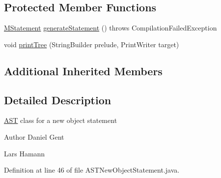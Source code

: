 \subsection*{Protected Member Functions}
\begin{DoxyCompactItemize}
\item 
\hyperlink{classorg_1_1tzi_1_1use_1_1uml_1_1sys_1_1soil_1_1_m_statement}{M\-Statement} \hyperlink{classorg_1_1tzi_1_1use_1_1parser_1_1soil_1_1ast_1_1_a_s_t_new_object_statement_ab316df67d7460f1923706ec9c9e97c11}{generate\-Statement} ()  throws Compilation\-Failed\-Exception 
\item 
void \hyperlink{classorg_1_1tzi_1_1use_1_1parser_1_1soil_1_1ast_1_1_a_s_t_new_object_statement_a2238cf400f5d8230f16e4c601264e778}{print\-Tree} (String\-Builder prelude, Print\-Writer target)
\end{DoxyCompactItemize}
\subsection*{Additional Inherited Members}


\subsection{Detailed Description}
\hyperlink{classorg_1_1tzi_1_1use_1_1parser_1_1_a_s_t}{A\-S\-T} class for a new object statement \begin{DoxyAuthor}{Author}
Daniel Gent 

Lars Hamann 
\end{DoxyAuthor}


Definition at line 46 of file A\-S\-T\-New\-Object\-Statement.\-java.



